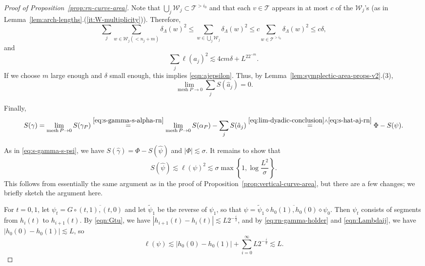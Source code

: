 \documentclass[12pt,reqno]{amsart}
\newcommand{\cT}{\mathcal{T}}
\newcommand{\cW}{\mathcal{W}}
\DeclareMathOperator{\mesh}{mesh}
\theoremstyle{remark}
\newcommand{\0}{\mathbf{0}}
\renewcommand{\1}{\mathbf 1}
\begin{document}
\begin{proof}[Proof of Proposition~\ref{prop:rn-curve-area}]
  Note that $\bigcup_j \cW_j \subset \cT^{>i_0}$ and that each $v\in \cT$ appears in at most $c$ of the $\cW_j$'s (as in Lemma~\ref{lem:arch-lengths}.(\ref{it:W-multiplicity})). Therefore, 
  $$
  \sum_j \sum_{w\in \cW_j(<n_j + m)}\delta_\Lambda(w)^2 \le \sum_{w\in \bigcup_j \cW_j}\delta_\Lambda(w)^2 \le c \sum_{w\in \cT^{>i_0}}\delta_\Lambda(w)^2 \le c\delta,
  $$
  and
  $$\sum_j \ell(a_j)^2\lesssim 4cm\delta + L^22^{-m}.$$
  If we choose $m$ large enough and $\delta$ small enough, this implies \eqref{eqn:ajepsilon}. Thus, by Lemma~\ref{lem:symplectic-area-props-v2}.(3), 
  \begin{equation}\label{eq:s-hat-aj-rn}
    \lim_{\mesh P \to 0}\sum_j S(\hat{a}_j) = 0.
  \end{equation}

  Finally,
  \begin{equation}\label{eq:sgamma-rn}
    S(\gamma) = \lim_{\mesh P \to 0} S(\gamma_P) \stackrel{\eqref{eq:s-gamma-s-alpha-rn}}{=} \lim_{\mesh P \to 0} S(\alpha_P) - \sum_j S(\hat{a}_j)  \stackrel{\eqref{eq:lim-dyadic-conclusion} \wedge \eqref{eq:s-hat-aj-rn}}{=} \Phi - S(\psi).
  \end{equation}

  As in \eqref{eq:s-gamma-s-psi}, we have $S(\hat\gamma)=\Phi-S(\hat\psi)$ and $|\Phi|\lesssim\sigma$. It remains to show that 
  \begin{equation}\label{eq:rn-target}
    S(\hat{\psi}) \lesssim \ell(\psi)^2 \lesssim \sigma\max\left\{1,\log\frac{L^2}{\sigma}\right\}.
  \end{equation}
  This follows from essentially the same argument as in the proof of Proposition~\ref{prop:vertical-curve-area}, but there are a few changes; we briefly sketch the argument here.

  For $t=0,1$, let $\psi_t = G\circ \overline{(t,1),(t,0)}$ and let $\tilde{\psi}_1$ be the reverse of $\psi_1$, so that $\psi = \tilde{\psi}_1 \diamond \overline{h_0(1), h_0(0)}\diamond \psi_0$. 
  Then $\psi_t$ consists of segments from $h_i(t)$ to $h_{i+1}(t)$. By \eqref{eqn:Gtu}, we have $|h_{i+1}(t)-h_i(t)|\lesssim L2^{-\frac{i}{2}}$, and by \eqref{eq:rn-gamma-holder} and \eqref{eqn:Lambdaij}, we have $|h_0(0)-h_0(1)| \lesssim L$, so
  \begin{equation}\label{eq:ell-psi-rn}
    \ell(\psi) \lesssim |h_0(0)-h_0(1)| + \sum_{i=0}^\infty L2^{-\frac{i}{2}} \lesssim L.
  \end{equation}


\end{proof}
\end{document}
